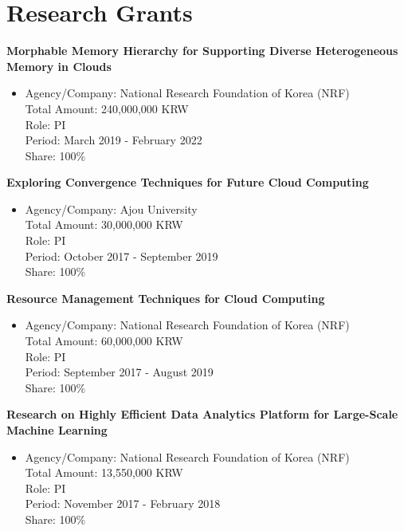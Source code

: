 \section*{Research Grants}
\begin{description}
    \item \textbf{Morphable Memory Hierarchy for Supporting Diverse Heterogeneous Memory in Clouds}
        \begin{itemize}
            \item Agency/Company: National Research Foundation of Korea (NRF) \\
                Total Amount: 240,000,000 KRW \\
                Role: PI \\
                Period: March 2019 - February 2022 \\
                Share: 100\%
        \end{itemize}


    \item \textbf{Exploring Convergence Techniques for Future Cloud Computing}
        \begin{itemize}
            \item Agency/Company: Ajou University \\
                Total Amount: 30,000,000 KRW \\
                Role: PI \\
                Period: October 2017 - September 2019 \\
                Share: 100\%
        \end{itemize}

    \item \textbf{Resource Management Techniques for Cloud Computing}
        \begin{itemize}
            \item Agency/Company: National Research Foundation of Korea (NRF) \\
                Total Amount: 60,000,000 KRW \\
                Role: PI \\
                Period: September 2017 - August 2019 \\
                Share: 100\%
        \end{itemize}

    \item \textbf{Research on Highly Efficient Data Analytics Platform for Large-Scale Machine Learning}
        \begin{itemize}
            \item Agency/Company: National Research Foundation of Korea (NRF) \\
                Total Amount: 13,550,000 KRW \\
                Role: PI \\
                Period: November 2017 - February 2018 \\
                Share: 100\%
        \end{itemize}

\end{description}
